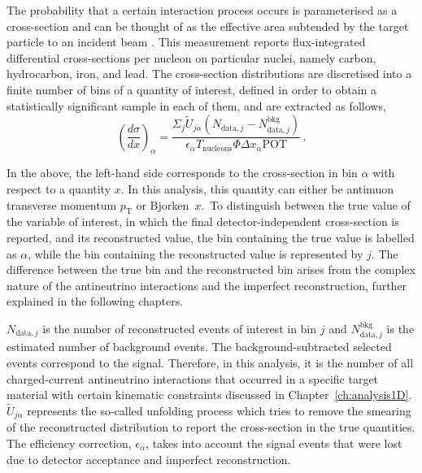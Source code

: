 The probability that a certain interaction process occurs is parameterised as a cross-section and can be thought of as the effective area subtended by the target particle to an incident beam \cite{perkins_2000}. This measurement reports flux-integrated differential cross-sections per nucleon on particular nuclei, namely carbon, hydrocarbon, iron, and lead. The cross-section distributions are discretised into a finite number of bins of a quantity of interest, defined in order to obtain a statistically significant sample in each of them, and are extracted as follows,
\begin{equation}
    \label{eq:xsec1D}
    {\left(\frac{d\sigma}{dx}\right)}_{\alpha} = \frac{\Sigma_{j} \tilde{U}_{j\alpha}(N_{\text{data}, j} - N^{\text{bkg}}_{\text{data}, j})}{\epsilon_{\alpha} T_{\text{nucleons}} \Phi \Delta x_{\alpha} \text{POT}} \hspace{2pt}.
\end{equation}

In the above, the left-hand side corresponds to the cross-section in bin $\alpha$ with respect to a quantity $x$. In this analysis, this quantity can either be antimuon transverse momentum $p_{\text{T}}$ or Bjorken~$x$.~To distinguish between the true value of the variable of interest, in which the final detector-independent cross-section is reported, and its reconstructed value, the bin containing the true value is labelled as $\alpha$, while the bin containing the reconstructed value is represented by $j$. The difference between the true bin and the reconstructed bin arises from the complex nature of the antineutrino interactions and the imperfect reconstruction, further explained in the following chapters.

$N_{\text{data}, j}$ is the number of reconstructed events of interest in bin $j$ and $N_{\text{data},j}^{\text{bkg}}$ is the estimated number of background events. The background-subtracted selected events correspond to the signal. Therefore, in this analysis, it is the number of all charged-current antineutrino interactions that occurred in a specific target material with certain kinematic constraints discussed in Chapter~\ref{ch:analysis1D}. $\tilde{U}_{j\alpha}$ represents the so-called unfolding process which tries to
remove the smearing of the reconstructed distribution to report the cross-section in the true quantities. The efficiency correction, $\epsilon_{\alpha}$, takes into account the signal events that were lost due to detector acceptance and imperfect reconstruction. 

